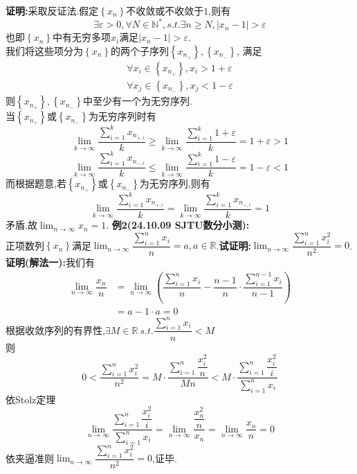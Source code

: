 \documentclass[a4paper,oneside]{ctexart}
\begin{document}
\textbf{证明:}采取反证法.假定$\left\{ x_n\right\}$不收敛或不收敛于$1$,则有
$$\exists\varepsilon>0,\forall N\in\mathbb{N}^*,s.t.\exists n\geqslant N,\left\lvert x_n-1\right\rvert>\varepsilon$$
也即$\left\{ x_n\right\}$中有无穷多项$x_i$满足$\left\lvert x_n-1\right\rvert>\varepsilon$.\\
我们将这些项分为$\left\{ x_n\right\}$的两个子序列$\left\{ x_{n_+}\right\},\left\{ x_{n_-}\right\}$,
满足$$\begin{aligned}
    \forall x_i\in\left\{ x_{n_+}\right\},x_i>1+\varepsilon \\
    \forall x_j\in\left\{ x_{n_-}\right\},x_j<1-\varepsilon
\end{aligned}$$
则$\left\{ x_{n_+}\right\},\left\{ x_{n_-}\right\}$中至少有一个为无穷序列.\\
当$\left\{ x_{n_+}\right\}$或$\left\{ x_{n_-}\right\}$为无穷序列时有
$$\lim_{k\to\infty}{\dfrac{\sum_{i=1}^{k}{x_{n_{+,i}}}}{k}}\geqslant \lim_{k\to\infty}{\dfrac{\sum_{i=1}^{k}{1+\varepsilon}}{k}}=1+\varepsilon>1$$
$$\lim_{k\to\infty}{\dfrac{\sum_{i=1}^{k}{x_{n_{-,i}}}}{k}}\leqslant \lim_{k\to\infty}{\dfrac{\sum_{i=1}^{k}{1-\varepsilon}}{k}}=1-\varepsilon<1$$
而根据题意,若$\left\{ x_{n_+}\right\}$或$\left\{ x_{n_-}\right\}$为无穷序列,则有
$$\lim_{k\to\infty}{\dfrac{\sum_{i=1}^{k}{x_{n_{+,i}}}}{k}}=\lim_{k\to\infty}{\dfrac{\sum_{i=1}^{k}{x_{n_{-,i}}}}{k}=1}$$
矛盾.故$\lim_{n\to\infty}{x_n}=1$.
\newpage\noindent
\textbf{例2(24.10.09 SJTU数分小测):}\\
正项数列$\left\{ x_n\right\}$满足$\lim_{n\to\infty}{\dfrac{\sum_{i=1}^{n}{x_i}}{n}}=a,a\in\mathbb{R}$.\textbf{试证明:}$\lim_{n\to\infty}{\dfrac{\sum_{i=1}^{n}{x_i^2}}{n^2}}=0$.\\
\textbf{证明(解法一):}我们有
$$\begin{aligned}
    \lim_{n\to\infty}{\dfrac{x_n}{n}} &= \lim_{n\to\infty}{\left(\dfrac{\sum_{i=1}^{n}{x_i}}{n}-\dfrac{n-1}{n}\cdot\dfrac{\sum_{i=1}^{n-1}{x_i}}{n-1}\right)} \\\
                                      &= a-1\cdot a= 0
\end{aligned}$$
根据收敛序列的有界性,$\exists M\in\mathbb{R}\ s.t.\dfrac{\sum_{i=1}^{n}{x_i}}{n}<M$\\
则$$0<\dfrac{\sum_{i=1}^{n}{x_i^2}}{n^2}=M\cdot\dfrac{\sum_{i=1}^{n}{\dfrac{x_i^2}{n}}}{Mn}<M\cdot\dfrac{\sum_{i=1}^{n}{\dfrac{x_i^2}{i}}}{\sum_{i=1}^{n}{x_i}}$$
依Stolz定理$$\lim_{n\to\infty}{\dfrac{\sum_{i=1}^{n}{\dfrac{x_i^2}{i}}}{\sum_{i=1}^{n}{x_i}}}=\lim_{n\to\infty}{\dfrac{\dfrac{x_n^2}{n}}{x_n}}=\lim_{n\to\infty}{\dfrac{x_n}{n}}=0$$
依夹逼准则$\lim_{n\to\infty}{\dfrac{\sum_{i=1}^{n}{x_i^2}}{n^2}}=0$,证毕.\\
\end{document}
